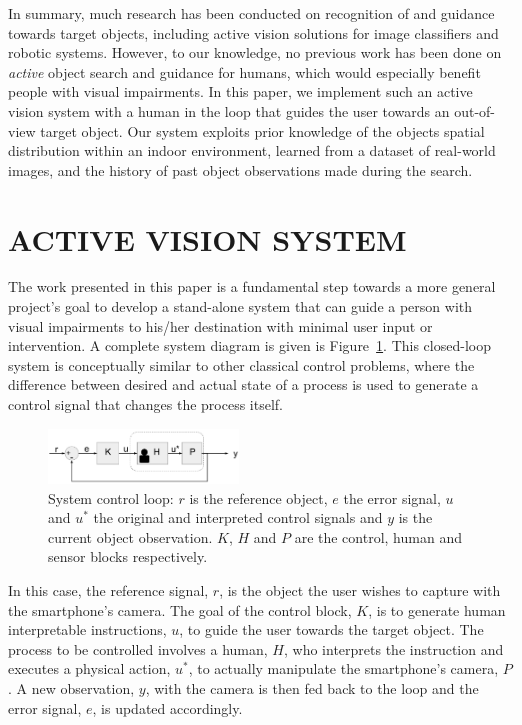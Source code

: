 \documentclass[a4paper, twoside]{article}
\begin{document}
In summary, much research has been conducted on recognition of and guidance towards target objects, including active vision solutions for image classifiers and robotic systems. However, to our knowledge, no previous work has been done on {\em active} object search and guidance for humans, which would especially benefit people with visual impairments. In this paper, we implement such an active vision system with a human in the loop
that guides the user towards an out-of-view target object. Our system exploits prior knowledge of the objects spatial distribution within an indoor environment, learned from a dataset of real-world images, and the history of past object observations made during the search.

\section{\uppercase{Active Vision System}}\label{sec:system-design}

\noindent The work presented in this paper is a fundamental step towards a more general project's goal to develop a stand-alone system that can guide a person with visual impairments to his/her destination with minimal user input or intervention. A complete system diagram is given is Figure~\ref{fig:control-loop}. This closed-loop system is conceptually similar to other classical control problems, where the difference between desired and actual state of a process is used to generate a control signal that changes the process itself.

\begin{figure}
  \centering
  \includegraphics[width=0.45\textwidth]{figures/control_loop.png}
  \caption{System control loop: $r$ is the reference object, $e$ the error signal, $u$ and $u^*$ the original and interpreted control signals and $y$ is the current object observation. $K$, $H$ and $P$ are the control, human and sensor blocks respectively. }\label{fig:control-loop}
\end{figure}

In this case, the reference signal, $r$, is the object the user wishes to capture with the smartphone's camera. The goal of the control block, $K$, is to generate human interpretable instructions, $u$, to guide the user towards the target object. The process to be controlled involves a human, $H$, who interprets the instruction and executes a physical action, $u^*$, to actually manipulate the smartphone's camera, $P$. A new observation, $y$, with the camera is then fed back to the loop and the error signal, $e$, is updated accordingly.  
\end{document}
